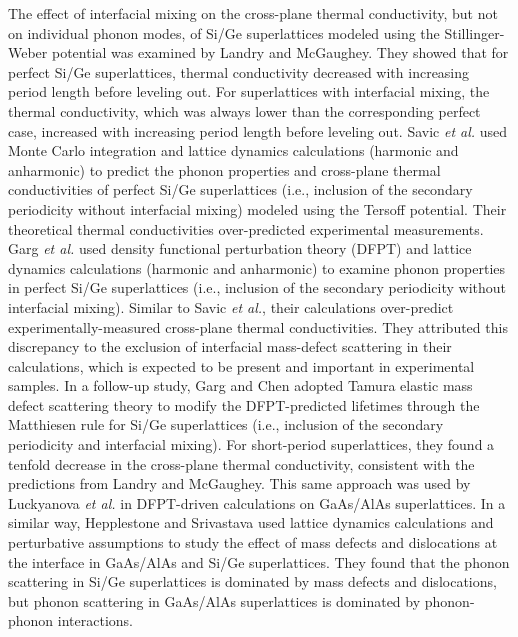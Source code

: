 \documentclass[aps,prb,preprint,preprintnumbers,amsmath,amssymb,floatfix,superscriptaddress]{revtex4}
\begin{document}
The effect of interfacial mixing on the cross-plane thermal conductivity, but not on individual phonon modes, of Si/Ge superlattices modeled using the Stillinger-Weber potential was examined by Landry and McGaughey.\cite{PhysRevB.79.075316} They showed that for perfect Si/Ge superlattices, thermal conductivity decreased with increasing period length before leveling out. For superlattices with interfacial mixing, the thermal conductivity, which was always lower than the corresponding perfect case, increased with increasing period length before leveling out. Savic \textit{et al.} used Monte Carlo integration and lattice dynamics calculations (harmonic and anharmonic) to predict the phonon properties and cross-plane thermal conductivities of perfect Si/Ge superlattices (i.e., inclusion of the secondary periodicity without interfacial mixing) modeled using the Tersoff potential. \cite{savic:073113} Their theoretical thermal conductivities over-predicted experimental measurements. Garg \textit{et al.} used density functional perturbation theory (DFPT) and lattice dynamics calculations (harmonic and anharmonic) to examine phonon properties in perfect Si/Ge superlattices (i.e., inclusion of the secondary periodicity without interfacial mixing).\cite{doi:10.1021/nl202186y} Similar to Savic \textit{et al.}, their calculations over-predict experimentally-measured cross-plane thermal conductivities. They attributed this discrepancy to the exclusion of interfacial mass-defect scattering in their calculations, which is expected to be present and important in experimental samples. In a follow-up study, Garg and Chen adopted Tamura elastic mass defect scattering theory \cite{tamura_isotope_1983} to modify the DFPT-predicted lifetimes through the Matthiesen rule for Si/Ge superlattices (i.e., inclusion of the secondary periodicity and interfacial mixing).\cite{PhysRevB.87.140302} For short-period superlattices, they found a tenfold decrease in the cross-plane thermal conductivity, consistent with the predictions from Landry and McGaughey.\cite{PhysRevB.79.075316} This same approach was used by Luckyanova \textit{et al.} \cite{Luckyanova16112012} in DFPT-driven calculations on GaAs/AlAs superlattices. {\color{red}In a similar way, Hepplestone and Srivastava used lattice dynamics calculations and perturbative assumptions to study the effect of mass defects and dislocations at the interface in GaAs/AlAs and Si/Ge superlattices. \cite{hepplestone2010phononic,PhysRevB.84.115326} They found that the phonon scattering in Si/Ge superlattices is dominated by mass defects and dislocations, but phonon scattering in GaAs/AlAs superlattices is dominated by phonon-phonon interactions.}
\end{document}
